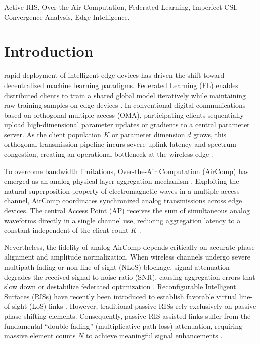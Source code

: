 \documentclass[journal,twocolumn]{IEEEtran}
\begin{document}
\begin{IEEEkeywords}
Active RIS, Over-the-Air Computation, Federated Learning, Imperfect CSI, Convergence Analysis, Edge Intelligence.
\end{IEEEkeywords}

\section{Introduction}

 rapid deployment of intelligent edge devices has driven the shift toward decentralized machine learning paradigms. Federated Learning (FL) enables distributed clients to train a shared global model iteratively while maintaining raw training samples on edge devices \cite{wei_yang_bryan_lim_de754dfb, zhijin_qin_43e06c44}. In conventional digital communications based on orthogonal multiple access (OMA), participating clients sequentially upload high-dimensional parameter updates or gradients to a central parameter server. As the client population $K$ or parameter dimension $d$ grows, this orthogonal transmission pipeline incurs severe uplink latency and spectrum congestion, creating an operational bottleneck at the wireless edge \cite{shiqiang_wang_04286fb1, mohammad_al_quraan_e9e152ba}.

To overcome bandwidth limitations, Over-the-Air Computation (AirComp) has emerged as an analog physical-layer aggregation mechanism \cite{guangxu_zhu_8807c15e, wanchun_liu_04bb0ec1}. Exploiting the natural superposition property of electromagnetic waves in a multiple-access channel, AirComp coordinates synchronized analog transmissions across edge devices. The central Access Point (AP) receives the sum of simultaneous analog waveforms directly in a single channel use, reducing aggregation latency to a constant independent of the client count $K$ \cite{xiaowen_cao_3da29c98, jingyang_zhu_dc837054}. 

Nevertheless, the fidelity of analog AirComp depends critically on accurate phase alignment and amplitude normalization. When wireless channels undergo severe multipath fading or non-line-of-sight (NLoS) blockage, signal attenuation degrades the received signal-to-noise ratio (SNR), causing aggregation errors that slow down or destabilize federated optimization \cite{xiaowen_cao_363accb9, jiacheng_yao_0a2deb55}. Reconfigurable Intelligent Surfaces (RISs) have recently been introduced to establish favorable virtual line-of-sight (LoS) links \cite{wanli_ni_d7a6fb6d, kai_yang_e91a43a3}. However, traditional passive RISs rely exclusively on passive phase-shifting elements. Consequently, passive RIS-assisted links suffer from the fundamental ``double-fading'' (multiplicative path-loss) attenuation, requiring massive element counts $N$ to achieve meaningful signal enhancements \cite{zijian_zhang_9030ef0d}.
\end{document}
